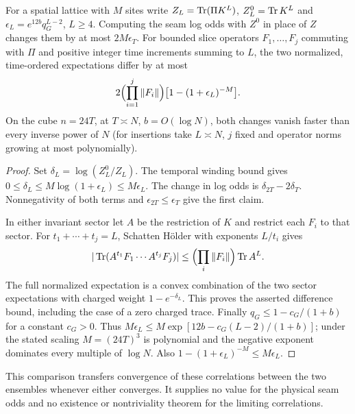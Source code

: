 \begin{corollary}
\label{cl:cor:temporal-physical}
For a spatial lattice with $M$ sites write $Z_L=\operatorname{Tr}(\Pi K^L)$,
$Z_L^0=\operatorname{Tr} K^L$ and $\epsilon_L=e^{12b}q_G^{L-2}$, $L\ge4$. Computing
the seam log odds with $Z^0$ in place of $Z$ changes them by at most
$2M\epsilon_T$. For bounded slice operators $F_1,\dots,F_j$ commuting
with $\Pi$ and positive integer time increments summing to $L$, the
two normalized, time-ordered expectations differ by at most
\[
 2\Bigl(\prod_{i=1}^{j}\|F_i\|\Bigr)\bigl[1-(1+\epsilon_L)^{-M}\bigr].
\]
On the cube $n=24T$, at $T\asymp N$, $b=O(\log N)$, both changes
vanish faster than every inverse power of $N$ (for insertions take
$L\asymp N$, $j$ fixed and operator norms growing at most polynomially).
\end{corollary}
\begin{proof}
Set $\delta_L=\log(Z_L^0/Z_L)$. The temporal winding bound gives
$0\le\delta_L\le M\log(1+\epsilon_L)\le M\epsilon_L$. The change in
log odds is $\delta_{2T}-2\delta_T$. Nonnegativity of both terms and
$\epsilon_{2T}\le\epsilon_T$ give the first claim.

In either invariant sector let $A$ be the restriction of $K$ and
restrict each $F_i$ to that sector. For $t_1+\cdots+t_j=L$, Schatten
H\"older with exponents $L/t_i$ gives
\[
 |\operatorname{Tr}(A^{t_1}F_1\cdots A^{t_j}F_j)|
 \le \Bigl(\prod_i\|F_i\|\Bigr)\operatorname{Tr} A^L .
\]
The full normalized expectation is a convex combination of the two
sector expectations with charged weight $1-e^{-\delta_L}$. This proves
the asserted difference bound, including the case of a zero charged
trace. Finally $q_G\le1-c_G/(1+b)$ for a constant $c_G>0$.
Thus $M\epsilon_L\le M\exp[12b-c_G(L-2)/(1+b)]$; under the stated
scaling $M=(24T)^3$ is polynomial and the negative exponent dominates
every multiple of $\log N$. Also $1-(1+\epsilon_L)^{-M}\le M\epsilon_L$.
\end{proof}
This comparison transfers convergence of these correlations between the
two ensembles whenever either converges. It supplies no value for the
physical seam odds and no existence or nontriviality theorem for the
limiting correlations.
